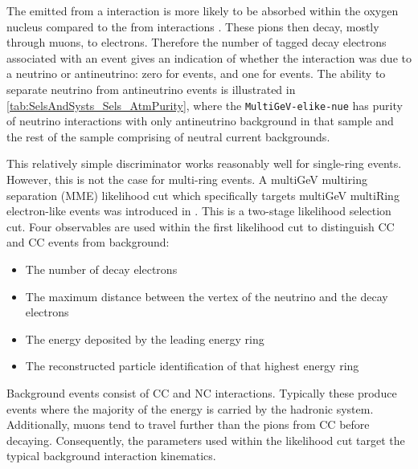 The \quickmath{\pi^{-}} emitted from a  interaction is more likely to be absorbed within the oxygen nucleus compared to the \quickmath{\pi^{+}} from  interactions \cite{LeeKaPik}. These pions then decay, mostly through muons, to electrons. Therefore the number of tagged decay electrons associated with an event gives an indication of whether the interaction was due to a neutrino or antineutrino: zero for  events, and one for  events. The ability to separate neutrino from antineutrino events is illustrated in \autoref{tab:SelsAndSysts_Sels_AtmPurity}, where the \texttt{MultiGeV-elike-nue} has  purity of neutrino interactions with only  antineutrino background in that sample and the rest of the sample comprising of neutral current backgrounds.

This relatively simple discriminator works reasonably well for single-ring events. However, this is not the case for multi-ring events. A multiGeV multiring separation (MME) likelihood cut which specifically targets multiGeV multiRing electron-like events was introduced in \cite{PhysRevD.81.092004, PhysRevD.74.032002}. This is a two-stage likelihood selection cut. Four observables are used within the first likelihood cut to distinguish CC and CC events from background:

\begin{itemize}
\item The number of decay electrons
\item The maximum distance between the vertex of the neutrino and the decay electrons
\item The energy deposited by the leading energy ring
\item The reconstructed particle identification of that highest energy ring
\end{itemize}

Background events consist of CC\quickmath{\nu_{\mu}} and NC interactions. Typically these produce events where the majority of the energy is carried by the hadronic system. Additionally, muons tend to travel further than the pions from CC before decaying. Consequently, the parameters used within the likelihood cut target the typical background interaction kinematics.

